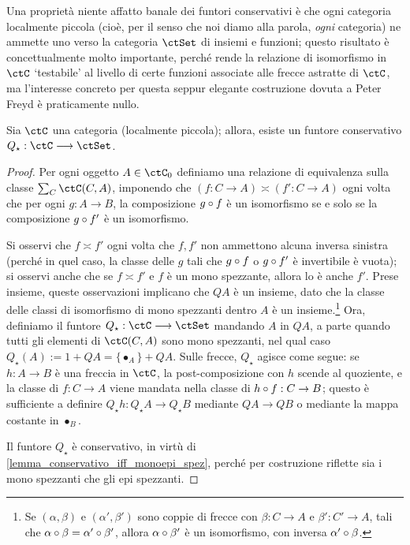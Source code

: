 Una proprietà niente affatto banale dei funtori conservativi è che ogni categoria localmente piccola (cioè, per il senso che noi diamo alla parola, \emph{ogni} categoria) ne ammette uno verso la categoria \(\ctSet\) di insiemi e funzioni; questo risultato è concettualmente molto importante, perché rende la relazione di isomorfismo in \(\ctC\) `testabile' al livello di certe funzioni associate alle frecce astratte di \(\ctC\), ma l'interesse concreto per questa seppur elegante costruzione dovuta a Peter Freyd \cite{fconc} è praticamente nullo.
\begin{theorem}
	Sia \(\ctC\) una categoria (localmente piccola); allora, esiste un funtore conservativo \(Q_\star : \ctC\fun\ctSet\).
\end{theorem}
\begin{proof}
	Per ogni oggetto \(A\in\ctC_0\) definiamo una relazione di equivalenza sulla classe \(\sum_C\Hom\ctC(C,A)\), imponendo che \((f : C\to A)\asymp(f' : C\to A)\) ogni volta che per ogni \(g :A\to B\), la composizione \(g\circ f\) è un isomorfismo se e solo se la composizione \(g\circ f'\) è un isomorfismo.

	Si osservi che \(f\asymp f'\) ogni volta che \(f,f'\) non ammettono alcuna inversa sinistra (perché in quel caso, la classe delle \(g\) tali che \(g\circ f\) o \(g\circ f'\) è invertibile è vuota); si osservi anche che se \(f\asymp f'\) e \(f\) è un mono spezzante, allora lo è anche \(f'\). Prese insieme, queste osservazioni implicano che \(QA\) è un insieme, dato che la classe delle classi di isomorfismo di mono spezzanti dentro \(A\) è un insieme.\footnote{Se \((\alpha,\beta)\) e \((\alpha',\beta')\) sono coppie di frecce con \(\beta : C\to A\) e \(\beta' : C'\to A\), tali che \(\alpha\circ\beta = \alpha'\circ\beta'\), allora \(\alpha\circ\beta'\) è un isomorfismo, con inversa \(\alpha'\circ\beta\).} Ora, definiamo il funtore \(Q_\star : \ctC\fun\ctSet\) mandando \(A\) in \(QA\), a parte quando tutti gli elementi di \(\Hom\ctC(C,A)\) sono mono spezzanti, nel qual caso \(Q_\star(A):=1+QA = \{\bullet_A\}+QA\). Sulle frecce, \(Q_\star\) agisce come segue: se \(h : A\to B\) è una freccia in \(\ctC\), la post-composizione con \(h\) scende al quoziente, e la classe di \(f : C\to A\) viene mandata nella classe di \(h\circ f : C\to B\); questo è sufficiente a definire \(Q_\star h : Q_\star A \to Q_\star B\) mediante \(QA\to QB\) o mediante la mappa costante in \(\bullet_B\).

	Il funtore \(Q_\star\) è conservativo, in virtù di \ref{lemma_conservativo_iff_monoepi_spez}, perché per costruzione riflette sia i mono spezzanti che gli epi spezzanti.
\end{proof}
